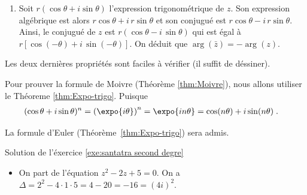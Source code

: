 \begin{corrige}
\begin{dem}
\begin{enumerate}
	      \begin{align*}
	            \arg\left( \frac{z}{z'} \right) & = \arg\left( z \cdot \frac{1}{z'} \right)      \\
	                                            & = \arg z + \arg\left( \frac{1}{z'} \right)
	                                              = \arg z - \arg z'                              .
	      \end{align*}
	\item Soit $r (\cos \theta + i \sin \theta)$ l'expression trigonom\'etrique de $z$. 
	      Son expression alg\'ebrique est alors $r \cos \theta + i \, r \sin \theta$ et 
	      son conjugu\'e est $r \cos \theta - i \, r \sin \theta$.
	      Ainsi, le conjugu\'e de $z$ est $ r ( \cos \theta - i \, \sin \theta) $ 
	      qui est \'egal \`a $ r \left[ \cos (- \theta ) + i \, \sin (- \theta) \right]$.
	      On d\'eduit que $\arg(\bar{z}) = - \arg(z)$.
\end{enumerate}
Les deux derni\`eres propri\'et\'es sont faciles \`a v\'erifier (il suffit de d\'essiner).
\end{dem}
\begin{dem}
	\label{dem:Moivre}
	Pour prouver la formule de Moivre (Th\'eor\`eme \ref{thm:Moivre}), nous allons utiliser le Th\'eoreme \ref{thm:Expo-trigo}.
	Puisque 
	\begin{align*}
	(\cos \theta + i \sin \theta)^n & = \left( \expo{i \theta} \right)^n         
	                                  = \expo{i n \theta}                        
	                                  = \cos (n \theta) + i \sin (n \theta)     \;.
	\end{align*}
\end{dem}
\begin{dem}
      \label{dem:Expo-trigo}
      La formule d'Euler (Th\'eor\`eme~\ref{thm:Expo-trigo}) sera admis.
\end{dem}
\begin{sol}
\label{sol:santatra second degre}
Solution de l'\'exercice \ref{exe:santatra second degre} \\
	\begin{itemize}
		\item On part de l'\'equation $z^2 - 2 z + 5 = 0$. 
			On a $\Delta = 2^2 - 4 \cdot 1 \cdot 5 = 4 - 20 = -16 = (4i)^2$.

\end{itemize}
\end{sol}
\end{corrige}
